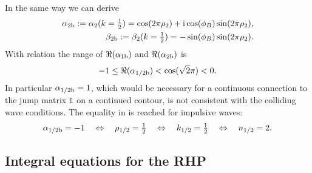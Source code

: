 \documentclass[12pt]{iopart}
\begin{document}
In the same way we can derive 
\begin{eqnarray}
\alpha_{2{\rm b}}:=\alpha_{2}(k=\mbox{$\frac12$}) = \cos (2\pi \rho_2)+{\rm i} \cos(\phi_B) \sin (2 \pi  \rho_2), \label{alpha2R}\\
\beta_{2{\rm b}}:=\beta_{2}(k=\mbox{$\frac12$}) = - \sin(\phi_B) \sin (2 \pi \rho_2). \label{alphabeta2R}
\end{eqnarray}
With relation  the range of $\Re(\alpha_{1{\rm b}})$ and $\Re(\alpha_{2{\rm b}})$ is
\begin{eqnarray}
-1\leq\Re(\alpha_{1/2{\rm b}}) < \cos(\sqrt{2}\pi)<0. \label{RealphaDom}
\end{eqnarray}
In particular $\alpha_{1/2{\rm b}}=1$, which would be necessary for a continuous connection to the jump matrix $\mathbb{1}$ on a continued contour, is not consistent with the colliding wave conditions.
The equality in  is reached for impulsive waves:
\begin{eqnarray}
\alpha_{1/2{\rm b}}=-1 \quad\Leftrightarrow\quad \rho_{1/2}=\mbox{$\frac12$}
\quad\Leftrightarrow\quad k_{1/2}=\mbox{$\frac12$} \quad\Leftrightarrow\quad n_{1/2}=2.
\end{eqnarray}


\subsection{Integral equations for the RHP}
\end{document}
